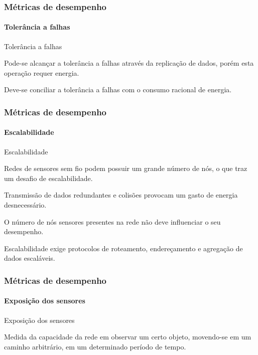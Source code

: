 \documentclass[notes]{beamer}
\begin{document}
\begin{frame}
\label{slide_29}
\frametitle{Métricas de desempenho}
\framesubtitle{Tolerância a falhas}

\begin{block}{Tolerância a falhas}

Pode-se alcançar a tolerância a falhas através da replicação de dados, porém esta operação requer energia. 
\end{block}  \pause

\begin{block}

Deve-se conciliar a tolerância a falhas com o consumo racional de energia.

\end{block}

\end{frame}

\begin{frame}
\label{slide_30}
\frametitle{Métricas de desempenho}
\framesubtitle{Escalabilidade}

\begin{block}{Escalabilidade}

Redes de sensores sem fio podem possuir um grande número de nós, o que traz um desafio de escalabilidade. 
\end{block} \pause

\begin{alertblock}

Transmissão de dados redundantes e colisões provocam um gasto de energia desnecessário.  
\end{alertblock} \pause

\begin{alertblock}

O número de nós sensores presentes na rede não deve influenciar o seu desempenho. 
\end{alertblock} \pause

\begin{block}

Escalabilidade exige protocolos de roteamento, endereçamento e agregação de dados escaláveis.

\end{block}

\end{frame}

\begin{frame}
\label{slide_31}
\frametitle{Métricas de desempenho}
\framesubtitle{Exposição dos sensores}

\begin{block}{Exposição dos sensores}

Medida da capacidade da rede em observar um certo objeto, movendo-se em um caminho arbitrário, em um determinado período de tempo.
 
\end{block} 

\end{frame}
\end{document}
